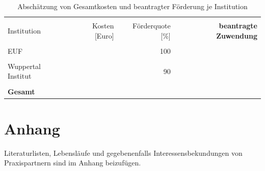 \documentclass[a4paper,11pt,twoside]{scrartcl}
\begin{document}
\begin{table}[h]
\begin{center}
  \caption{Abschätzung von Gesamtkosten und beantragter Förderung je Institution}
\begin{tabular}[h]{|l | r | r | r|}
\hline
&&&\\
Institution & Kosten [Euro] & Förderquote [\%] & \textbf{beantragte Zuwendung}\\
\hline
\hline
 &&&\\
 EUF & & 100 &\\
 \hline
 &&&\\
 Wuppertal Institut & & 90 &\\
 \hline
 \hline
 &&&\\
 \textbf{Gesamt} & & &\underline{\textbf{}}\\
 \hline
 \end{tabular}
 \label{tab:kostenkalkulation2}
\end{center}
\end{table}

\clearpage


%


\clearpage
\appendix

\section{Anhang}

Literaturlisten, Lebensläufe und gegebenenfalls Interessensbekundungen von Praxispartnern sind im Anhang beizufügen.
\end{document}

